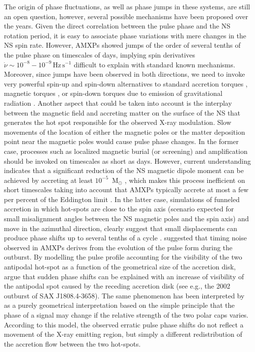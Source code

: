 \documentclass[fleqn,usenatbib]{mnras}
\begin{document}
The origin of phase fluctuations, as well as phase jumps in these systems, are still an open question, however, several possible mechanisms have been proposed over the years. Given the direct correlation between the pulse phase and the NS rotation period, it is easy to associate phase variations with mere changes in the NS spin rate. However, AMXPs showed jumps of the order of several tenths of the pulse phase on timescales of days, implying spin derivatives $\dot{\nu}\sim10^{-8}-10^{-9}\,\text{Hz}\,\text{s}^{-1}$ difficult to explain with standard known mechanisms. Moreover, since jumps have been observed in both directions, we need to invoke very powerful spin-up and spin-down alternatives to standard accretion torques \citep[see e.g.,][]{Lamb:1978uf,Ghosh:1979ws}, magnetic torques \citep[see e.g.,][]{Wang95,Rappaport:2004tr,Kluzniak07}, or spin-down torques due to emission of gravitational radiation \citep[see e.g.,][]{Bildsten:1998wb}.
Another aspect that could be taken into account is the interplay between the magnetic field and accreting matter on the surface of the NS that generates the hot spot responsible for the observed X-ray modulation. Slow movements of the location of either the magnetic poles or the matter deposition point near the magnetic poles would cause pulse phase changes. In the former case, processes such as localized magnetic burial (or screening) and amplification should be invoked on timescales as short as days. However, current understanding indicates that a significant reduction of the NS magnetic dipole moment can be achieved by accreting at least $10^{-5}$~M$_\odot$ \citep{Payne:2004wj}, which makes this process inefficient on short timescales taking into account that AMXPs typically accrete at most a few per percent of the Eddington limit \citep[see e.g.,][]{Di-Salvo:2020va,Patruno:2021vs}. In the latter case, simulations of funneled accretion in which hot-spots are close to the spin axis (scenario expected for small misalignment angles between the NS magnetic poles and the spin axis) and move in the azimuthal direction, clearly suggest that small displacements can produce phase shifts up to several tenths of a cycle \citep[see e.g.,][and references therein]{Lamb:2009wf}.     
\citet{Poutanen:2009wb} suggested that timing noise observed in AMXPs derives from the evolution of the pulse form during the outburst. By modelling the pulse profile accounting for the visibility of the two antipodal hot-spot as a function of the geometrical size of the accretion disk, \citet{Poutanen:2009wb} argue that sudden phase shifts can be explained with an increase of visibility of the antipodal spot caused by the receding accretion disk (see e.g., the 2002 outburst of SAX J1808.4-3658). The same phenomenon has been interpreted by \citet{Riggio2022} as a purely geometrical interpretation based on the simple principle that the phase of a signal may change if the relative strength of the two polar caps varies. According to this model, the observed erratic pulse phase shifts do not reflect a movement of the X-ray emitting region, but simply a different redistribution of the accretion flow between the two hot-spots.
\end{document}

